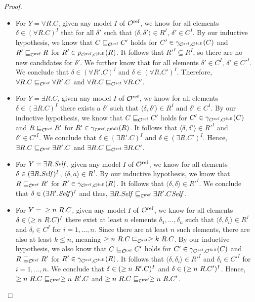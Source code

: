 \begin{proof}
\begin{itemize}
    \item For $Y = \forall R.C$, given any model $I$ of ${\mathcal{O}^\textnormal{ref}}$, we know for all elements $\delta \in (\forall R.C)^I$ that for all $\delta'$ such that $\langle \delta, \delta' \rangle \in R^I$, $\delta' \in C^I$. By our inductive hypothesis, we know that $C \sqsubseteq_{\mathcal{O}^\textnormal{ref}} C'$ holds for $C' \in \gamma_{{\mathcal{O}^\textnormal{ref}},{\mathcal{O}^\textnormal{full}}}(C)$ and $R' \sqsubseteq_{\mathcal{O}^\textnormal{ref}} R$ for $R' \in \rho_{{\mathcal{O}^\textnormal{ref}},{\mathcal{O}^\textnormal{full}}}(R)$. It follows that $R'^I \subseteq R^I$, so there are no new candidates for $\delta'$. We further know that for all elements $\delta' \in C^I$, $\delta' \in C'^I$. We conclude that $\delta \in (\forall R'.C)^I$ and $\delta \in (\forall R.C')^I$. Therefore, $\forall R.C \sqsubseteq_{\mathcal{O}^\textnormal{ref}} \forall R'.C$ and $\forall R.C \sqsubseteq_{\mathcal{O}^\textnormal{ref}} \forall R.C'$.
    \item For $Y = \exists R.C$, given any model $I$ of ${\mathcal{O}^\textnormal{ref}}$, we know for all elements $\delta \in (\exists R.C)^I$ there exists a $\delta'$ such that $\langle \delta, \delta' \rangle \in R^I$ and $\delta' \in C^I$. By our inductive hypothesis, we know that $C \sqsubseteq_{\mathcal{O}^\textnormal{ref}} C'$ holds for $C' \in \gamma_{{\mathcal{O}^\textnormal{ref}},{\mathcal{O}^\textnormal{full}}}(C)$ and $R \sqsubseteq_{\mathcal{O}^\textnormal{ref}} R'$ for $R' \in \gamma_{{\mathcal{O}^\textnormal{ref}},{\mathcal{O}^\textnormal{full}}}(R)$. It follows that $\langle \delta, \delta' \rangle \in R'^I$ and $\delta' \in C'^I$. We conclude that $\delta \in (\exists R'.C)^I$ and $\delta \in (\exists R.C')^I$. Hence, $\exists R.C \sqsubseteq_{\mathcal{O}^\textnormal{ref}} \exists R'.C$ and $\exists R.C \sqsubseteq_{\mathcal{O}^\textnormal{ref}} \exists R.C'$.
    \item For $Y = \exists R.\mathit{Self}$, given any model $I$ of ${\mathcal{O}^\textnormal{ref}}$, we know for all elements $\delta \in (\exists R.\mathit{Self})^I$, $\langle \delta, a \rangle \in R^I$. By our inductive hypothesis, we know that $R \sqsubseteq_{\mathcal{O}^\textnormal{ref}} R'$ for $R' \in \gamma_{{\mathcal{O}^\textnormal{ref}},{\mathcal{O}^\textnormal{full}}}(R)$. It follows that $\langle \delta, \delta \rangle \in R'^I$. We conclude that $\delta \in (\exists R'.\mathit{Self})^I$ and thus, $\exists R.\mathit{Self} \sqsubseteq_{\mathcal{O}^\textnormal{ref}} \exists R'.C\mathit{Self}$.
    \item For $Y ={} \geq n~R.C$, given any model $I$ of ${\mathcal{O}^\textnormal{ref}}$, we know for all elements $\delta \in (\geq n~R.C)^I$ there exist at least $n$ elements $\delta_1, \dots, \delta_n$ such that $\langle \delta, \delta_i \rangle \in R^I$ and $\delta_i \in C^I$ for $i = 1, \dots, n$. Since there are at least $n$ such elements, there are also at least $k \leq n$, meaning $\geq n~R.C \sqsubseteq_{\mathcal{O}^\textnormal{ref}} \geq k~R.C$. By our inductive hypothesis, we also know that $C \sqsubseteq_{\mathcal{O}^\textnormal{ref}} C'$ holds for $C' \in \gamma_{{\mathcal{O}^\textnormal{ref}},{\mathcal{O}^\textnormal{full}}}(C)$ and $R \sqsubseteq_{\mathcal{O}^\textnormal{ref}} R'$ for $R' \in \gamma_{{\mathcal{O}^\textnormal{ref}},{\mathcal{O}^\textnormal{full}}}(R)$. It follows that $\langle \delta, \delta_i \rangle \in R'^I$ and $\delta_i \in C'^I$ for $i = 1, \dots, n$. We conclude that $\delta \in (\geq n~R'.C)^I$ and $\delta \in (\geq n~R.C')^I$. Hence, $\geq n~R.C \sqsubseteq_{\mathcal{O}^\textnormal{ref}} \geq n~R'.C$ and $\geq n~R.C \sqsubseteq_{\mathcal{O}^\textnormal{ref}} \geq n~R.C'$.

\end{itemize}
\end{proof}
